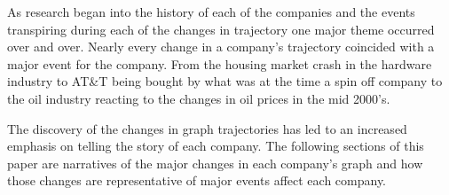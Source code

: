 	As research began into the history of each of the companies and the events transpiring during each of the changes in trajectory one major theme occurred over and over. Nearly every change in a company’s trajectory coincided with a major event for the company. From the housing market crash in the hardware industry to AT\&T being bought by what was at the time a spin off company to the oil industry reacting to the changes in oil prices in the mid 2000’s.\\
\newline

	The discovery of the changes in graph trajectories has led to an increased emphasis on telling the story of each company.  The following sections of this paper are narratives of the major changes in each company’s graph and how those changes are representative of major events affect each company. \\